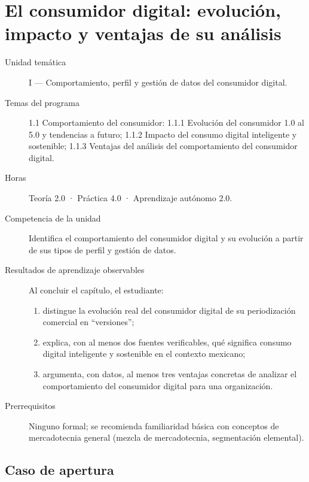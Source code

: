 \chapter{El consumidor digital: evolución, impacto y ventajas de su análisis}
\label{cap:01}

\begin{cajaFicha}
\begin{description}
  \item[Unidad temática] I — Comportamiento, perfil y gestión de datos del consumidor digital.
  \item[Temas del programa] 1.1 Comportamiento del consumidor: 1.1.1 Evolución del consumidor 1.0 al 5.0 y tendencias a futuro; 1.1.2 Impacto del consumo digital inteligente y sostenible; 1.1.3 Ventajas del análisis del comportamiento del consumidor digital.
  \item[Horas] Teoría 2.0 · Práctica 4.0 · Aprendizaje autónomo 2.0.
  \item[Competencia de la unidad] Identifica el comportamiento del consumidor digital y su evolución a partir de sus tipos de perfil y gestión de datos.
  \item[Resultados de aprendizaje observables] Al concluir el capítulo, el estudiante:
  \begin{enumerate}
    \item distingue la evolución real del consumidor digital de su periodización comercial en \enquote{versiones};
    \item explica, con al menos dos fuentes verificables, qué significa consumo digital inteligente y sostenible en el contexto mexicano;
    \item argumenta, con datos, al menos tres ventajas concretas de analizar el comportamiento del consumidor digital para una organización.
  \end{enumerate}
  \item[Prerrequisitos] Ninguno formal; se recomienda familiaridad básica con conceptos de mercadotecnia general (mezcla de mercadotecnia, segmentación elemental).
\end{description}
\end{cajaFicha}

\section{Caso de apertura}

